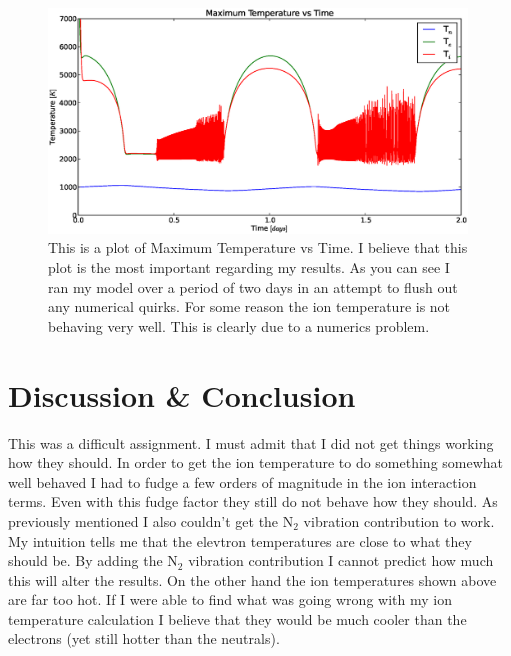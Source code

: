 \documentclass[10pt]{article}
\begin{document}
\begin{figure}[H]
	\centering
		\includegraphics[width=0.99\textwidth]{./figures/B/T_max_vs_time.eps}
	\caption{This is a plot of Maximum Temperature vs Time. I believe that this plot is the most important regarding my results. As you can see I ran my model over a period of two days in an attempt to flush out any numerical quirks. For some reason the ion temperature is not behaving very well. This is clearly due to a numerics problem.}
	\label{fig:n3}
\end{figure}

\section{Discussion \& Conclusion}
This was a difficult assignment. I must admit that I did not get things working how they should. In order to get the ion temperature to do something somewhat well behaved I had to fudge a few orders of magnitude in the ion interaction terms. Even with this fudge factor they still do not behave how they should. As previously mentioned I also couldn't get the N$_{2}$ vibration contribution to work. My intuition tells me that the elevtron temperatures are close to what they should be. By adding the N$_{2}$ vibration contribution I cannot predict how much this will alter the results. On the other hand the ion temperatures shown above are far too hot. If I were able to find what was going wrong with my ion temperature calculation I believe that they would be much cooler than the electrons (yet still hotter than the neutrals).
\end{document}
